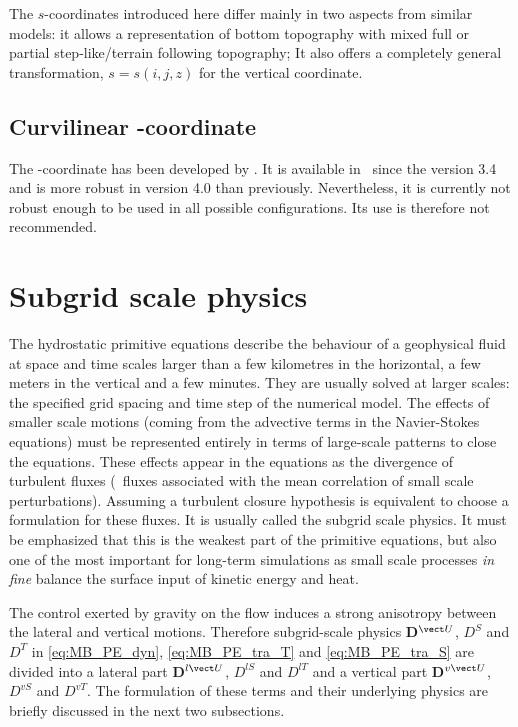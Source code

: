 \documentclass[../main/NEMO_manual]{subfiles}
\begin{document}
The $s$-coordinates introduced here \citep{lott.madec.ea_OM90,madec.delecluse.ea_JPO96}
differ mainly in two aspects from similar models:
it allows a representation of bottom topography with
mixed full or partial step-like/terrain following topography;
It also offers a completely general transformation, $s=s(i,j,z)$ for the vertical coordinate.

\subsection{Curvilinear \ztilde-coordinate}
\label{subsec:MB_zco_tilde}

The \ztilde-coordinate has been developed by \citet{leclair.madec_OM11}.
It is available in \NEMO\ since the version 3.4 and is more robust in version 4.0 than previously.
Nevertheless, it is currently not robust enough to be used in all possible configurations.
Its use is therefore not recommended.

\section{Subgrid scale physics}
\label{sec:MB_zdf_ldf}

The hydrostatic primitive equations describe the behaviour of a geophysical fluid at
space and time scales larger than a few kilometres in the horizontal,
a few meters in the vertical and a few minutes.
They are usually solved at larger scales: the specified grid spacing and time step of
the numerical model.
The effects of smaller scale motions (coming from the advective terms in the Navier-Stokes equations)
must be represented entirely in terms of large-scale patterns to close the equations.
These effects appear in the equations as the divergence of turbulent fluxes
(\ie\ fluxes associated with the mean correlation of small scale perturbations).
Assuming a turbulent closure hypothesis is equivalent to choose a formulation for these fluxes.
It is usually called the subgrid scale physics.
It must be emphasized that this is the weakest part of the primitive equations,
but also one of the most important for long-term simulations as
small scale processes \textit{in fine} balance the surface input of kinetic energy and heat.

The control exerted by gravity on the flow induces a strong anisotropy between
the lateral and vertical motions.
Therefore subgrid-scale physics \textbf{D}$^{\vect U}$, $D^{S}$ and $D^{T}$  in
\autoref{eq:MB_PE_dyn}, \autoref{eq:MB_PE_tra_T} and \autoref{eq:MB_PE_tra_S} are divided into
a  lateral part \textbf{D}$^{l \vect U}$, $D^{l S}$ and $D^{l T}$ and
a vertical part \textbf{D}$^{v \vect U}$, $D^{v S}$ and $D^{v T}$.
The formulation of these terms and their underlying physics are briefly discussed in
the next two subsections.
\end{document}
